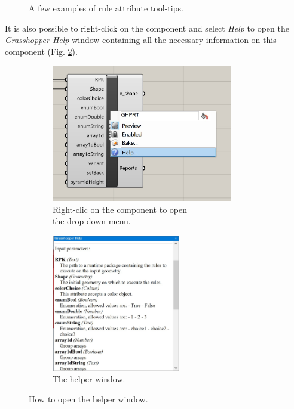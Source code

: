 \begin{figure}[h]
    \caption{A few examples of rule attribute tool-tips.}
    \label{fig:gh_tooltips}
\end{figure}

\vspace{0.1in}
It is also possible to right-click on the component and select \textit{Help} to open the \textit{Grasshopper Help} window containing all the necessary information on this component (Fig. \ref{fig:gh_helper}).

\begin{figure}[h]
    
    \begin{subfigure}{0.5\textwidth}
        \includegraphics[width=0.9\linewidth, height=6cm]{res/man_gh_helper_0.jpg}
        \caption{Right-clic on the component to open\\ the drop-down menu.}
    \end{subfigure}
    \begin{subfigure}{0.5\textwidth}
        \includegraphics[width=0.9\linewidth, height=6cm]{res/man_gh_helper_1.jpg}\caption{The helper window.}
    \end{subfigure}

    \caption{How to open the helper window.}
    \label{fig:gh_helper}
\end{figure}

\newpage

